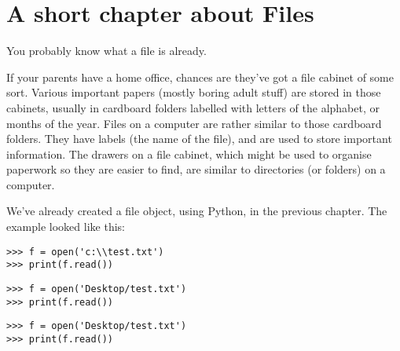 

\chapter{A short chapter about Files}\label{ch:ashortchapteraboutfiles}

You probably know what a file is already.
\par
\noindent
If your parents have a home office, chances are they've got a file cabinet of some sort.  Various important papers (mostly boring adult stuff) are stored in those cabinets, usually in cardboard folders labelled with letters of the alphabet, or months of the year. Files on a computer are rather similar to those cardboard folders. They have labels (the name of the file), and are used to store important information. The drawers on a file cabinet, which might be used to organise paperwork so they are easier to find, are similar to directories (or folders) on a computer.
\par
We've already created a file object, using Python, in the previous chapter.  The example looked like this:

\begin{WINDOWS}

\begin{listing}
\begin{verbatim}
>>> f = open('c:\\test.txt')
>>> print(f.read())
\end{verbatim}
\end{listing}

\end{WINDOWS}

\begin{MAC}

\begin{listing}
\begin{verbatim}
>>> f = open('Desktop/test.txt')
>>> print(f.read())
\end{verbatim}
\end{listing}

\end{MAC}

\begin{LINUX}

\begin{listing}
\begin{verbatim}
>>> f = open('Desktop/test.txt')
>>> print(f.read())
\end{verbatim}
\end{listing}
 
\end{LINUX}

